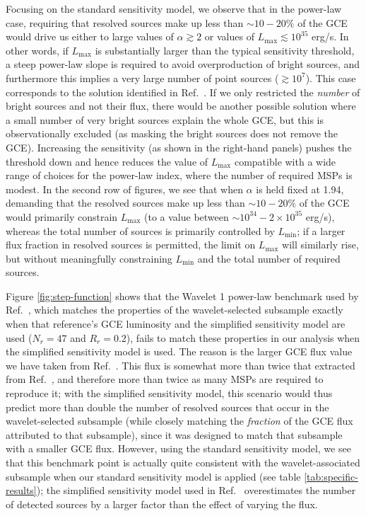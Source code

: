 \documentclass[letter,11pt]{article}
\begin{document}
Focusing on the standard sensitivity model, we observe that in the power-law case, requiring that resolved sources make up less than $\sim 10-20\%$ of the GCE would drive us either to large values of $\alpha \gtrsim 2$ or values of $L_\text{max} \lesssim 10^{35}$ erg/s. In other words, if $L_\text{max}$ is substantially larger than the typical sensitivity threshold, a steep power-law slope is required to avoid overproduction of bright sources, and furthermore this implies a very large number of point sources ($\gtrsim 10^7$). This case corresponds to the solution identified in Ref.~\cite{Zhong:2019ycb}. If we only restricted the {\it number} of bright sources and not their flux, there would be another possible solution where a small number of very bright sources explain the whole GCE, but this is observationally excluded (as masking the bright sources does not remove the GCE). Increasing the sensitivity (as shown in the right-hand panels) pushes the threshold down and hence reduces the value of $L_\text{max}$ compatible with a wide range of choices for the power-law index, where the number of required MSPs is modest. In the second row of figures, we see that when $\alpha$ is held fixed at 1.94, demanding that the resolved sources make up less than $\sim 10-20\%$ of the GCE would primarily constrain $L_\text{max}$ (to a value between $\sim 10^{34} - 2\times 10^{35}$ erg/s), whereas the total number of sources is primarily controlled by $L_\text{min}$; if a larger flux fraction in resolved sources is permitted, the limit on $L_\text{max}$ will similarly rise, but without meaningfully constraining $L_\text{min}$ and the total number of required sources.

Figure \ref{fig:step-function} shows that the Wavelet 1 power-law benchmark used by Ref.~\cite{Zhong:2019ycb}, which matches the properties of the wavelet-selected subsample exactly when that reference's GCE luminosity and the simplified sensitivity model are used ($N_r=47$ and $R_r=0.2$), fails to match these properties in our analysis when the simplified sensitivity model is used. The reason is the larger GCE flux value we have taken from Ref.~\cite{DiMauro:2021raz}. This flux is somewhat more than twice that extracted from Ref.~\cite{Zhong:2019ycb}, and therefore more than twice as many MSPs are required to reproduce it; with the simplified sensitivity model, this scenario would thus predict more than double the number of resolved sources that occur in the wavelet-selected subsample (while closely matching the {\it fraction} of the GCE flux attributed to that subsample), since it was designed to match that subsample with a smaller GCE flux. However, using the standard sensitivity model, we see that this benchmark point is actually quite consistent with the wavelet-associated subsample when our standard sensitivity model is applied (see table \ref{tab:specific-results}); the simplified sensitivity model used in Ref.~\cite{Zhong:2019ycb} overestimates the number of detected sources by a larger factor than the effect of varying the flux.
\end{document}
